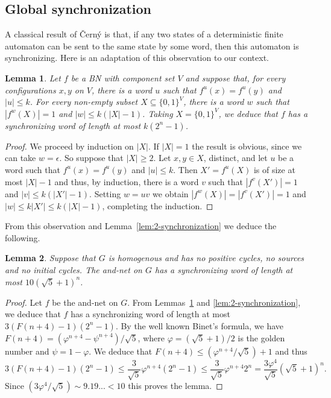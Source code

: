 \documentclass[11pt,letter]{article}
\newtheorem{lemma}{Lemma}
\newcommand{\B}{\{0,1\}}
\begin{document}
\subsection{Global synchronization}

A classical result of \v{C}ern\'y \cite{C64} is that, if any two states of a deterministic finite automaton can be sent to the same state by some word, then this automaton is synchronizing. Here is an adaptation of this observation to our context. 

\begin{lemma}\label{lem:2-synch}
Let $f$ be a BN with component set $V$ and suppose that, for every configurations $x,y$ on $V$, there is a word $u$ such that $f^u(x)=f^u(y)$ and $|u|\leq k$. For every non-empty subset $X\subseteq \B^V$, there is a word $w$ such that $|f^w(X)|=1$ and $|w|\leq k(|X|-1)$. Taking $X=\B^V$, we deduce that $f$ has a synchronizing word of length at most $k(2^n-1)$.
\end{lemma}

\begin{proof}
We proceed by induction on $|X|$. If $|X|=1$ the result is obvious, since we can take $w=\epsilon$. So suppose that $|X|\geq 2$. Let $x,y\in X$, distinct, and let $u$ be a word such that $f^u(x)=f^u(y)$ and $|u|\leq k$. Then $X'=f^u(X)$ is of size at most $|X|-1$ and thus, by induction, there is a word $v$ such that $|f^v(X')|=1$ and $|v|\leq k(|X'|-1)$. Setting $w=uv$ we obtain $|f^w(X)|=|f^v(X')|=1$ and $|w|\leq k|X'|\leq k(|X|-1)$, completing the induction. 
\end{proof}

From this observation and Lemma~\ref{lem:2-synchronization} we deduce the following. 

\begin{lemma}\label{lem:synchro_and_net}
Suppose that $G$ is homogenous and has no positive cycles, no sources and no initial cycles. The and-net on $G$ has a synchronizing word of length at most $10(\sqrt{5}+1)^n$.
\end{lemma}

\begin{proof}
Let $f$ be the and-net on $G$. From Lemmas~\ref{lem:2-synch} and \ref{lem:2-synchronization}, we deduce that $f$ has a synchronizing word of length at most $3(F(n+4)-1)(2^n-1)$. By the well known Binet's formula, we have $F(n+4)=(\varphi^{n+4}-\psi^{n+4})/\sqrt{5}$, where $\varphi=(\sqrt{5}+1)/2$ is the golden number and $\psi=1-\varphi$. We deduce that $F(n+4)\leq (\varphi^{n+4}/\sqrt{5})+1$ and thus 
\[
3(F(n+4)-1)(2^n-1)\leq \frac{3}{\sqrt{5}}\varphi^{n+4}(2^n-1)\leq \frac{3}{\sqrt{5}}\varphi^{n+4}2^n=\frac{3\varphi^4}{\sqrt{5}}(\sqrt{5}+1)^n.
\]
Since $(3\varphi^4/\sqrt{5})\sim 9.19... < 10$ this proves the lemma.
\end{proof}
\end{document}
